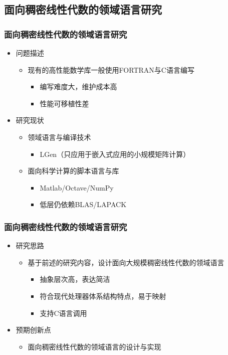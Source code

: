 \documentclass[aspectratio=169]{beamer}
\begin{document}
\subsection[领域语言研究]{面向稠密线性代数的领域语言研究}

\begin{frame}
  \frametitle{面向稠密线性代数的领域语言研究}
  \begin{itemize}
  \item 问题描述
    \begin{itemize}
    \item 现有的高性能数学库一般使用FORTRAN与C语言编写
      \begin{itemize}
      \item 编写难度大，维护成本高
      \item 性能可移植性差
      \end{itemize}
    \end{itemize}
  \item 研究现状
    \begin{itemize}
    \item 领域语言与编译技术
      \begin{itemize}
      \item LGen（只应用于嵌入式应用的小规模矩阵计算）
      \end{itemize}
    \item 面向科学计算的脚本语言与库
      \begin{itemize}
      \item Matlab/Octave/NumPy
      \item 低层仍依赖BLAS/LAPACK
      \end{itemize}
    \end{itemize}
  \end{itemize}
\end{frame}

\begin{frame}
  \frametitle{面向稠密线性代数的领域语言研究}
  \begin{itemize}
  \item 研究思路
    \begin{itemize}
    \item 基于前述的研究内容，设计面向大规模稠密线性代数的领域语言
      \begin{itemize}
      \item 抽象层次高，表达简洁
      \item 符合现代处理器体系结构特点，易于映射
      \item 支持C语言调用
      \end{itemize}
    \end{itemize}
  \item 预期创新点
    \begin{itemize}
    \item 面向稠密线性代数的领域语言的设计与实现
    \end{itemize}
  \end{itemize}
\end{frame}
\end{document}

